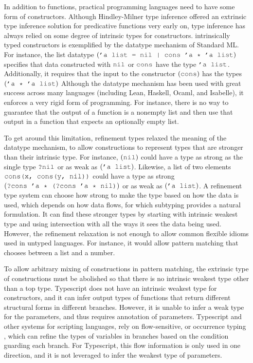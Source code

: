 \documentclass[acmsmall]{acmart}
\theoremstyle{definition}
\begin{document}

In addition to functions, practical programming languages need to have some form of constructors.
Although Hindley-Milner type inference offered an extrinsic type inference solution for predicative functions
very early on, type inference has always relied on some degree of intrinsic types for constructors.
intrinsically typed constructors is exemplified by the datatype mechanism of Standard ML.
For instance, the list datatype $(\J{'a list = nil | cons 'a * 'a list})$ specifies that 
data constructed with ${\J{nil}}$ or $\J{cons}$ have the type ${\J{'a list}}$. Additionally,
it requires that the input to the constructor $(\J{cons})$  has the types $(\J{'a * 'a list})$
Although the datatype mechanism has been used with great success across many languages (including Lean, Haskell, Ocaml, and Isabelle),
it enforces a very rigid form of programming. For instance, there is no way to guarantee
that the output of a function is a nonempty list and then use that output in a function that expects an optionally empty list.

To get around this limitation, refinement types \cite{} relaxed the meaning of the datatype mechanism, to 
allow constructions to represent types that are stronger than their intrinsic type.
For instance, $(\J{nil})$ could have a type as strong as the single type $\J{?nil}$ or as weak as $(\J{'a list})$.
Likewise, a list of two elements $\J{cons(x, cons(y, nil))}$ could have a type as strong $(\J{?cons 'a * (?cons 'a * nil)})$
or as weak as $(\J{'a list})$. A refinement type system can choose how strong to make the type based on how the data is used, 
which depends on how data flows, for which subtyping provides a natural formulation. 
It can find these stronger types by starting with intrinsic weakest type and using intersection with 
all the ways it sees the data being used.
However, the refinement relaxation is not enough to allow common flexible idioms used in untyped languages. 
For instance, it would allow pattern matching that chooses between a list and a number.

To allow arbitrary mixing of constructions in pattern matching, the extrinsic type of constructions
must be abolished so that there is no intrinsic weakest type other than a top type. 
Typescript \cite{} does not have an intrinsic weakest type for constructors,
and it can infer output types of functions that return different structural forms in different branches.
However, it is unable to infer a weak type for the parameters, and thus requires annotation of parameters.  
Typescript and other systems for scripting languages, rely on flow-sensitive, or occurrence typing \cite{},
which can refine the types of variables in branches based on the condition guarding each branch.
For Typescript, this flow information is only used in one direction, and it is not leveraged to infer
the weakest type of parameters.
\end{document}
